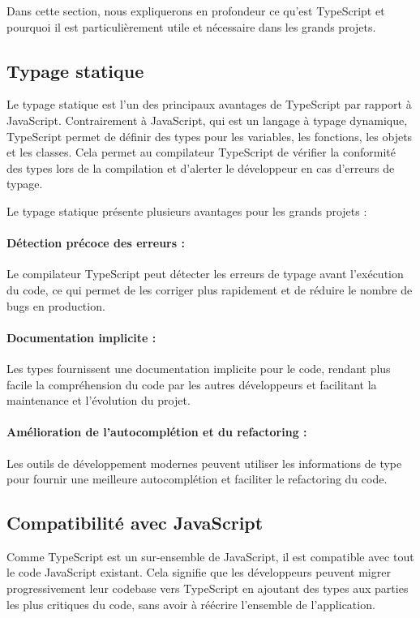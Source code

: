 Dans cette section, nous expliquerons en profondeur ce qu'est TypeScript et pourquoi il est particulièrement utile et nécessaire dans les grands projets.

\subsection{Typage statique}
Le typage statique est l'un des principaux avantages de TypeScript par rapport à JavaScript. Contrairement à JavaScript, qui est un langage à typage dynamique, TypeScript permet de définir des types pour les variables, les fonctions, les objets et les classes. Cela permet au compilateur TypeScript de vérifier la conformité des types lors de la compilation et d'alerter le développeur en cas d'erreurs de typage.

Le typage statique présente plusieurs avantages pour les grands projets :

\paragraph{Détection précoce des erreurs :} Le compilateur TypeScript peut détecter les erreurs de typage avant l'exécution du code, ce qui permet de les corriger plus rapidement et de réduire le nombre de bugs en production.
\paragraph{Documentation implicite :} Les types fournissent une documentation implicite pour le code, rendant plus facile la compréhension du code par les autres développeurs et facilitant la maintenance et l'évolution du projet.
\paragraph{Amélioration de l'autocomplétion et du refactoring :} Les outils de développement modernes peuvent utiliser les informations de type pour fournir une meilleure autocomplétion et faciliter le refactoring du code.

\subsection{Compatibilité avec JavaScript}

Comme TypeScript est un sur-ensemble de JavaScript, il est compatible avec tout le code JavaScript existant. Cela signifie que les développeurs peuvent migrer progressivement leur codebase vers TypeScript en ajoutant des types aux parties les plus critiques du code, sans avoir à réécrire l'ensemble de l'application.

